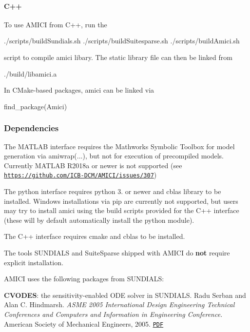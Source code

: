 \paragraph*{C++}

To use A\+M\+I\+CI from C++, run the ~\newline
\begin{DoxyVerb}./scripts/buildSundials.sh
./scripts/buildSuitesparse.sh
./scripts/buildAmici.sh
\end{DoxyVerb}


script to compile amici libary. The static library file can then be linked from \begin{DoxyVerb}./build/libamici.a
\end{DoxyVerb}


In C\+Make-\/based packages, amici can be linked via \begin{DoxyVerb}find_package(Amici)
\end{DoxyVerb}


\subsubsection*{Dependencies}

The M\+A\+T\+L\+AB interface requires the Mathworks Symbolic Toolbox for model generation via {\ttfamily amiwrap(...)}, but not for execution of precompiled models. Currently M\+A\+T\+L\+AB R2018a or newer is not supported (see \href{https://github.com/ICB-DCM/AMICI/issues/307}{\tt https\+://github.\+com/\+I\+C\+B-\/\+D\+C\+M/\+A\+M\+I\+C\+I/issues/307})

The python interface requires python 3. or newer and {\ttfamily cblas} library to be installed. Windows installations via pip are currently not supported, but users may try to install amici using the build scripts provided for the C++ interface (these will by default automatically install the python module).

The C++ interface requires {\ttfamily cmake} and {\ttfamily cblas} to be installed.

The tools S\+U\+N\+D\+I\+A\+LS and Suite\+Sparse shipped with A\+M\+I\+CI do {\bfseries not} require explicit installation.

A\+M\+I\+CI uses the following packages from S\+U\+N\+D\+I\+A\+LS\+:

{\bfseries C\+V\+O\+D\+ES}\+: the sensitivity-\/enabled O\+DE solver in S\+U\+N\+D\+I\+A\+LS. Radu Serban and Alan C. Hindmarsh. {\itshape A\+S\+ME 2005 International Design Engineering Technical Conferences and Computers and Information in Engineering Conference.} American Society of Mechanical Engineers, 2005. \href{http://proceedings.asmedigitalcollection.asme.org/proceeding.aspx?articleid=1588657}{\tt P\+DF}

